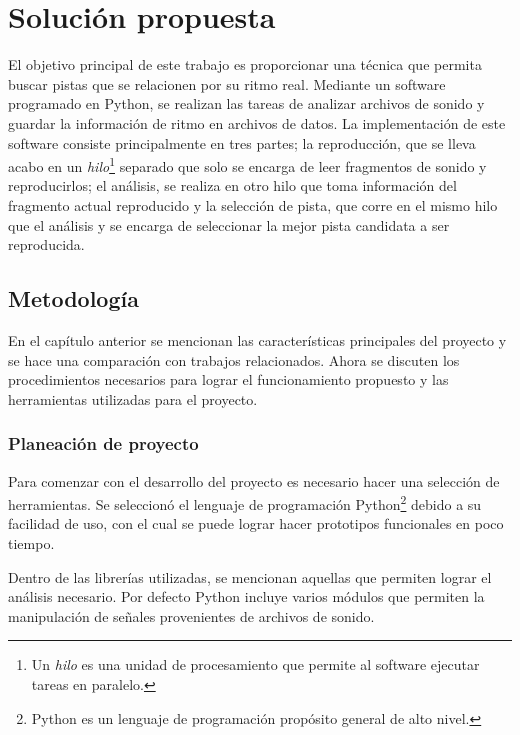 \chapter{Soluci\'on propuesta}
\label{chap:sol}

El objetivo principal de este trabajo es proporcionar una t\'ecnica que permita buscar pistas que se relacionen por su ritmo real. Mediante un software programado en {\sc Python}, se realizan las tareas de analizar archivos de sonido y guardar la informaci\'on de ritmo en archivos de datos. La implementaci\'on de este software consiste principalmente en tres partes; la reproducci\'on, que se lleva acabo en un {\em hilo}\footnote{Un {\em hilo} es una unidad de procesamiento que permite al software ejecutar tareas en paralelo.} separado que solo se encarga de leer fragmentos de sonido y reproducirlos; el an\'alisis, se realiza en otro hilo que toma informaci\'on del fragmento actual reproducido y la selecci\'on de pista, que corre en el mismo hilo que el an\'alisis y se encarga de seleccionar la mejor pista candidata a ser reproducida.

\section{Metodolog\'ia}

En el cap\'itulo anterior se mencionan las caracter\'isticas principales del proyecto y se hace una comparaci\'on con trabajos relacionados. Ahora se discuten los procedimientos necesarios para lograr el funcionamiento propuesto y las herramientas utilizadas para el proyecto.

\subsection{Planeaci\'on de proyecto}
Para comenzar con el desarrollo del proyecto es necesario hacer una selecci\'on de herramientas. Se seleccion\'o el lenguaje de programaci\'on {\sc Python}\footnote{{\sc Python} es un lenguaje de programaci\'on prop\'osito general de alto nivel.} debido a su facilidad de uso, con el cual se puede lograr hacer prototipos funcionales en poco tiempo. 

\noindent Dentro de las librer\'ias utilizadas, se mencionan aquellas que permiten lograr el an\'alisis necesario. Por defecto {\sc Python} incluye varios m\'odulos que permiten la manipulaci\'on de se\~nales provenientes de archivos de sonido.

